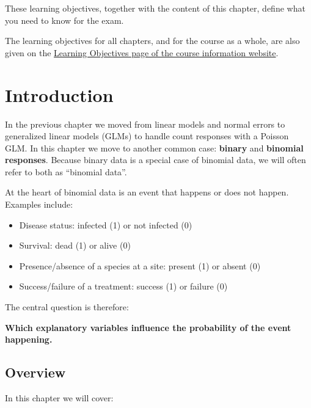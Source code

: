 \documentclass[
  letterpaper,
  8pt,
  a4paper]{book}
\providecommand{\tightlist}{%
  \setlength{\itemsep}{0pt}\setlength{\parskip}{0pt}}
\begin{document}
\begin{tcolorbox}
These learning objectives, together with the content of this chapter,
define what you need to know for the exam.

The learning objectives for all chapters, and for the course as a whole,
are also given on the
\href{https://opetchey.github.io/BIO144_Course_Information/3.1-learning-objectives.html}{Learning
Objectives page of the course information website}.

\end{tcolorbox}

\section*{Introduction}\label{introduction-6}


In the previous chapter we moved from linear models and normal errors to
generalized linear models (GLMs) to handle count responses with a
Poisson GLM. In this chapter we move to another common case:
\textbf{binary} and \textbf{binomial responses}. Because binary data is
a special case of binomial data, we will often refer to both as
``binomial data''.

At the heart of binomial data is an event that happens or does not
happen. Examples include:

\begin{itemize}
\tightlist
\item
  Disease status: infected (1) or not infected (0)
\item
  Survival: dead (1) or alive (0)
\item
  Presence/absence of a species at a site: present (1) or absent (0)
\item
  Success/failure of a treatment: success (1) or failure (0)
\end{itemize}

The central question is therefore:

\textbf{Which explanatory variables influence the probability of the
event happening.}

\subsection*{Overview}\label{overview}

In this chapter we will cover:
\end{document}
